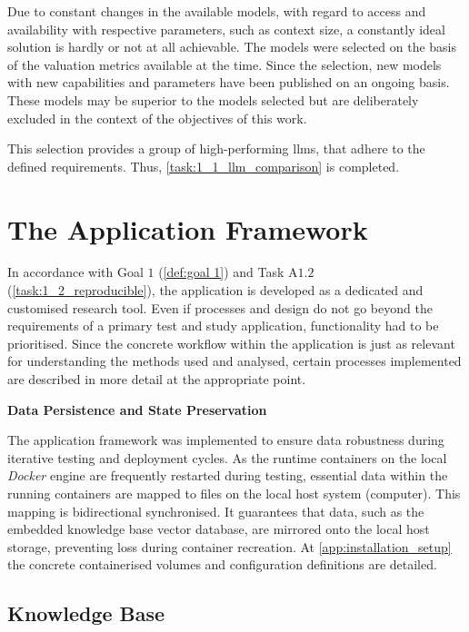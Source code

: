 Due to constant changes in the available models, with regard to access and availability with respective parameters, such as context size, a constantly ideal solution is hardly or not at all achievable.
The models were selected on the basis of the valuation metrics available at the time.
Since the selection, new models with new capabilities and parameters have been published on an ongoing basis. 
These models may be superior to the models selected but are deliberately excluded in the context of the objectives of this work.
%

This selection provides a group of high-performing \acp{llm}, that adhere to the defined requirements.
Thus, \cref{task:1_1_llm_comparison} is completed.
%
\section{The Application Framework}
In accordance with Goal $1$ (\cref{def:goal 1}) and Task A$1.2$ (\cref{task:1_2_reproducible}), the application is developed as a dedicated and customised research tool.
Even if processes and design do not go beyond the requirements of a primary test and study application, functionality had to be prioritised.
Since the concrete workflow within the application is just as relevant for understanding the methods used and analysed, certain processes implemented are described in more detail at the appropriate point.

\noindent \textbf{Data Persistence and State Preservation}\label{par:data_persistency_docker}

The application framework was implemented to ensure data robustness during iterative testing and deployment cycles.
As the runtime containers on the local \textit{Docker} engine are frequently restarted during testing, essential data within the running containers are mapped to files on the local host system (computer).
This mapping is bidirectional synchronised.
It guarantees that data, such as the embedded knowledge base vector database, are mirrored onto the local host storage, preventing loss during container recreation.
At \cref{app:installation_setup} the concrete containerised volumes and configuration definitions are detailed.

\subsection{Knowledge Base}\label{sec:knowledgeb_sol}


